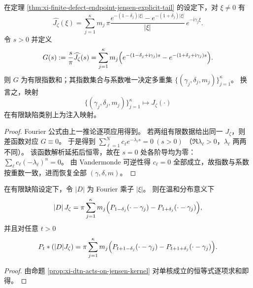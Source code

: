 \begin{theorem}\label{thm:xi-jensen-potential-fourier-laplace-injective}
在定理 \ref{thm:xi-finite-defect-endpoint-jensen-explicit-tail} 的设定下，对 \(\xi\neq 0\) 有
\[
\widehat{J_\zeta}(\xi)
=\sum_{j=1}^{\kappa}m_j\,
\pi\frac{e^{-(1-\delta_j)|\xi|}-e^{-(1+\delta_j)|\xi|}}{|\xi|}\,e^{-\mathrm{i}\gamma_j\xi}.
\]
令 \(s>0\) 并定义
\[
G(s):=\frac{s}{\pi}\widehat{J_\zeta}(s)
=\sum_{j=1}^{\kappa}m_j\Bigl(e^{-(1-\delta_j+\mathrm{i}\gamma_j)s}-e^{-(1+\delta_j+\mathrm{i}\gamma_j)s}\Bigr).
\]
则 \(G\) 为有限指数和；其指数集合与系数唯一决定多重集
\(
\{(\gamma_j,\delta_j,m_j)\}_{j=1}^{\kappa}
\)。
换言之，映射
\[
\{(\gamma_j,\delta_j,m_j)\}_{j=1}^{\kappa}\longmapsto J_\zeta(\cdot)
\]
在有限缺陷类别上为注入映射。
\end{theorem}
\begin{proof}
Fourier 公式由上一推论逐项应用得到。
若两组有限数据给出同一 \(J_\zeta\)，则差函数对应 \(G\equiv 0\)。
于是得到
\(
\sum_{\ell=1}^{N}c_\ell e^{-\lambda_\ell s}=0\ (s>0)
\)
（\(\Re\lambda_\ell>0\)，\(\lambda_\ell\) 两两不同）。
该函数解析延拓后恒零，故在 \(s=0\) 处各阶导均为零：
\(
\sum_\ell c_\ell(-\lambda_\ell)^n=0
\)。
由 Vandermonde 可逆性得 \(c_\ell=0\) 全部成立，故指数与系数按重数一致，进而恢复全部 \((\gamma,\delta,m)\)。
\end{proof}

\begin{proposition}\label{prop:xi-jensen-poisson-intertwiner-two-scale}
在有限缺陷设定下，令 \(|D|\) 为 Fourier 乘子 \(|\xi|\)。
则在温和分布意义下
\[
|D|\,J_\zeta
=\pi\sum_{j=1}^{\kappa}m_j\Bigl(P_{1-\delta_j}(\cdot-\gamma_j)-P_{1+\delta_j}(\cdot-\gamma_j)\Bigr),
\]
并且对任意 \(t>0\)
\[
P_t*(|D|J_\zeta)
=\pi\sum_{j=1}^{\kappa}m_j\Bigl(P_{t+1-\delta_j}(\cdot-\gamma_j)-P_{t+1+\delta_j}(\cdot-\gamma_j)\Bigr).
\]
\end{proposition}
\begin{proof}
由命题 \ref{prop:xi-dtn-acts-on-jensen-kernel} 对单核成立的恒等式逐项求和即得。
\end{proof}



